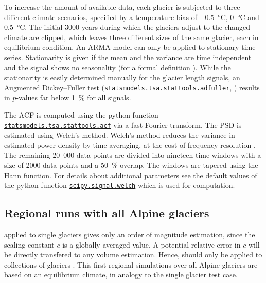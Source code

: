         To increase the amount of available data, each glacier is subjected to three different climate scenarios, specified by a temperature bias of \SI{-0.5}{\celsius}, \SI{0}{\celsius} and \SI{+0.5}{\celsius}. The initial 3000 years during which the glaciers adjust to the changed climate are clipped, which leaves three different sizes of the same glacier, each in equilibrium condition. An ARMA model can only be applied to stationary time series. Stationarity is given if the mean and the variance are time independent and the signal shows no seasonality (for a formal definition \citet[e.g.,][]{BoxJenkins2015}). While the stationarity is easily determined manually for the glacier length signals, an Augmented Dickey--Fuller test (\href{https://www.statsmodels.org/devel/generated/statsmodels.tsa.stattools.adfuller.html}{\lstinline`statsmodels.tsa.stattools.adfuller`}, \citet{Cheung1995-ADFuller}) results in $p$-values far below \SI{1}{\percent} for all signals.

        The ACF is computed using the python function \href{https://www.statsmodels.org/devel/generated/statsmodels.tsa.stattools.acf.html}{\lstinline`statsmodels.tsa.stattools.acf`} via a fast Fourier transform. The PSD is estimated using Welch's method. Welch's method reduces the variance in  estimated power density by time-averaging, at the cost of frequency resolution \citep[e.g.,][]{Welch1967, Proakis2007}.  The remaining 20\ 000 data points are divided into nineteen time windows with a size of 2000 data points and a \SI{50}{\percent} overlap. The windows are tapered using the Hann function. For details about additional parameters see the default values of the python function \href{https://docs.scipy.org/doc/scipy/reference/generated/scipy.signal.welch.html}{\lstinline`scipy.signal.welch`} which is used for computation.
    

    \subsection{Regional runs with all Alpine glaciers} %
    \label{sub:regional_runs_with_all_alpine_glaciers_setup}
        \Vas{} applied to single glaciers gives only an order of magnitude estimation, since the scaling constant $c$ is a globally averaged value. A potential relative error in $c$ will be directly transfered to any volume estimation. Hence, \vas{} should only be applied to collections of glaciers \citep{Bahr2015}. 
        This first regional simulations over all Alpine glaciers are based on an equilibrium climate, in analogy to the single glacier test case.

